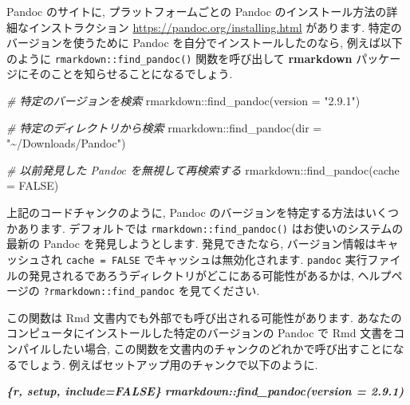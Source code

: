 \documentclass[
  11pt,
  lualatex,ja=standard,jafont=noto]{bxjsreport}
\newenvironment{Shaded}{\begin{snugshade}}{\end{snugshade}}
\newcommand{\AttributeTok}[1]{\textcolor[rgb]{0.77,0.63,0.00}{#1}}
\newcommand{\CommentTok}[1]{\textcolor[rgb]{0.56,0.35,0.01}{\textit{#1}}}
\newcommand{\ConstantTok}[1]{\textcolor[rgb]{0.00,0.00,0.00}{#1}}
\newcommand{\FunctionTok}[1]{\textcolor[rgb]{0.00,0.00,0.00}{#1}}
\newcommand{\InformationTok}[1]{\textcolor[rgb]{0.56,0.35,0.01}{\textbf{\textit{#1}}}}
\newcommand{\NormalTok}[1]{#1}
\newcommand{\SpecialCharTok}[1]{\textcolor[rgb]{0.00,0.00,0.00}{#1}}
\newcommand{\StringTok}[1]{\textcolor[rgb]{0.31,0.60,0.02}{#1}}
\begin{document}
Pandoc のサイトに, プラットフォームごとの Pandoc のインストール方法の詳細なインストラクション \url{https://pandoc.org/installing.html} があります. 特定のバージョンを使うために Pandoc を自分でインストールしたのなら, 例えば以下のように \texttt{rmarkdown::find\_pandoc()} 関数を呼び出して \textbf{rmarkdown} パッケージにそのことを知らせることになるでしょう.

\begin{Shaded}
\begin{Highlighting}[numbers=left,,]
\CommentTok{\# 特定のバージョンを検索}
\NormalTok{rmarkdown}\SpecialCharTok{::}\FunctionTok{find\_pandoc}\NormalTok{(}\AttributeTok{version =} \StringTok{"2.9.1"}\NormalTok{)}

\CommentTok{\# 特定のディレクトリから検索}
\NormalTok{rmarkdown}\SpecialCharTok{::}\FunctionTok{find\_pandoc}\NormalTok{(}\AttributeTok{dir =} \StringTok{"\textasciitilde{}/Downloads/Pandoc"}\NormalTok{)}

\CommentTok{\# 以前発見した Pandoc を無視して再検索する}
\NormalTok{rmarkdown}\SpecialCharTok{::}\FunctionTok{find\_pandoc}\NormalTok{(}\AttributeTok{cache =} \ConstantTok{FALSE}\NormalTok{)}
\end{Highlighting}
\end{Shaded}

上記のコードチャンクのように, Pandoc のバージョンを特定する方法はいくつかあります. デフォルトでは \texttt{rmarkdown::find\_pandoc()} はお使いのシステムの最新の Pandoc を発見しようとします. 発見できたなら, バージョン情報はキャッシュされ \texttt{cache = FALSE} でキャッシュは無効化されます. \texttt{pandoc} 実行ファイルの発見されるであろうディレクトリがどこにある可能性があるかは, ヘルプページの \texttt{?rmarkdown::find\_pandoc} を見てください.

この関数は Rmd 文書内でも外部でも呼び出される可能性があります. あなたのコンピュータにインストールした特定のバージョンの Pandoc で Rmd 文書をコンパイルしたい場合, この関数を文書内のチャンクのどれかで呼び出すことになるでしょう. 例えばセットアップ用のチャンクで以下のように.

\begin{Shaded}
\begin{Highlighting}[]
\InformationTok{\textasciigrave{}\textasciigrave{}\textasciigrave{}\{r, setup, include=FALSE\}}
\InformationTok{rmarkdown::find\_pandoc(version = \textquotesingle{}2.9.1\textquotesingle{})}
\InformationTok{\textasciigrave{}\textasciigrave{}\textasciigrave{}}
\end{Highlighting}
\end{Shaded}
\end{document}
